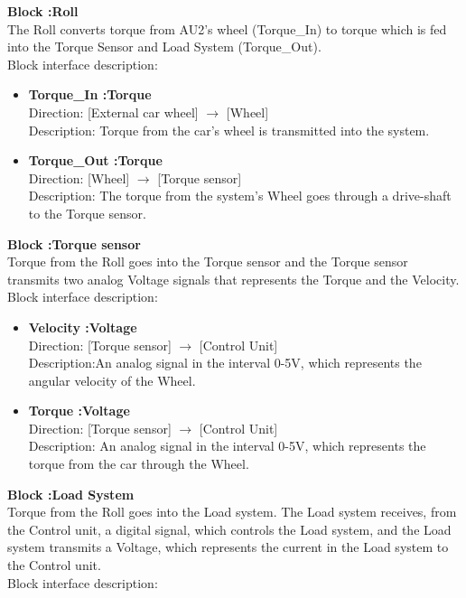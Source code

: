 \textbf{Block :Roll}\\
The Roll converts torque from AU2's wheel (Torque\_In) to torque which is fed into the Torque Sensor and Load System (Torque\_Out).\\ 
Block interface description:

\begin{itemize}
	\item \textbf{Torque\_In :Torque}\\
		Direction: [External car wheel] $\rightarrow$ [Wheel]\\
		Description: Torque from the car's wheel is transmitted into the system.
	\item \textbf{Torque\_Out :Torque}\\
		Direction: [Wheel] $\rightarrow$ [Torque sensor]\\
		Description: The torque from the system's Wheel goes through a drive-shaft to the Torque sensor.
\end{itemize}

\textbf{Block :Torque sensor}\\
Torque from the Roll goes into the Torque sensor and the Torque sensor transmits two analog Voltage signals that represents the Torque and the Velocity.
\\Block interface description:

\begin{itemize}
	\item \textbf{Velocity :Voltage}\\
		Direction: [Torque sensor] $\rightarrow$ [Control Unit]\\
		Description:An analog signal in the interval 0-5V, which represents the angular velocity of the Wheel.
	\item \textbf{Torque :Voltage}\\
		Direction: [Torque sensor] $\rightarrow$ [Control Unit]\\
		Description: An analog signal in the interval 0-5V, which represents the torque from the car through the Wheel.
\end{itemize}

\textbf{Block :Load System}\\
Torque from the Roll goes into the Load system. The Load system receives, from the Control unit, a digital signal, which controls the Load system, and the Load system transmits a Voltage, which represents the current in the Load system to the Control unit.\\
Block interface description:

